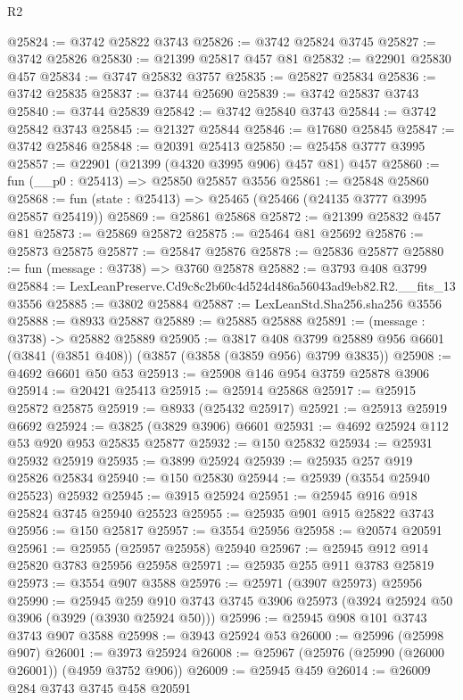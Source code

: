 \begin{lexlean}{R2}
\begin{coremodule}
@25824 := @3742 @25822 @3743
@25826 := @3742 @25824 @3745
@25827 := @3742 @25826
@25830 := @21399 @25817 @457 @81
@25832 := @22901 @25830 @457
@25834 := @3747 @25832 @3757
@25835 := @25827 @25834
@25836 := @3742 @25835
@25837 := @3744 @25690
@25839 := @3742 @25837 @3743
@25840 := @3744 @25839
@25842 := @3742 @25840 @3743
@25844 := @3742 @25842 @3743
@25845 := @21327 @25844
@25846 := @17680 @25845
@25847 := @3742 @25846
@25848 := @20391 @25413
@25850 := @25458 @3777 @3995
@25857 := @22901 (@21399 (@4320 @3995 @906) @457 @81) @457
@25860 := fun (__p0 : @25413) => @25850 @25857 @3556
@25861 := @25848 @25860
@25868 := fun (state : @25413) => @25465 (@25466 (@24135 @3777 @3995 @25857 @25419))
@25869 := @25861 @25868
@25872 := @21399 @25832 @457 @81
@25873 := @25869 @25872
@25875 := @25464 @81 @25692
@25876 := @25873 @25875
@25877 := @25847 @25876
@25878 := @25836 @25877
@25880 := fun (message : @3738) => @3760 @25878
@25882 := @3793 @408 @3799
@25884 := LexLeanPreserve.Cd9c8c2b60c4d524d486a56043ad9eb82.R2.__fits_13 @3556
@25885 := @3802 @25884
@25887 := LexLeanStd.Sha256.sha256 @3556
@25888 := @8933 @25887
@25889 := @25885 @25888
@25891 := (message : @3738) -> @25882 @25889
@25905 := @3817
    @408
    @3799
    @25889
    @956
    @6601
    (@3841 (@3851 @408))
    (@3857 (@3858 (@3859 @956) @3799 @3835))
@25908 := @4692 @6601 @50 @53
@25913 := @25908 @146 @954 @3759 @25878 @3906
@25914 := @20421 @25413
@25915 := @25914 @25868
@25917 := @25915 @25872 @25875
@25919 := @8933 (@25432 @25917)
@25921 := @25913 @25919 @6692
@25924 := @3825 (@3829 @3906) @6601
@25931 := @4692 @25924 @112 @53 @920 @953 @25835 @25877
@25932 := @150 @25832
@25934 := @25931 @25932 @25919
@25935 := @3899 @25924
@25939 := @25935 @257 @919 @25826 @25834
@25940 := @150 @25830
@25944 := @25939 (@3554 @25940 @25523) @25932
@25945 := @3915 @25924
@25951 := @25945 @916 @918 @25824 @3745 @25940 @25523
@25955 := @25935 @901 @915 @25822 @3743
@25956 := @150 @25817
@25957 := @3554 @25956
@25958 := @20574 @20591
@25961 := @25955 (@25957 @25958) @25940
@25967 := @25945 @912 @914 @25820 @3783 @25956 @25958
@25971 := @25935 @255 @911 @3783 @25819
@25973 := @3554 @907 @3588
@25976 := @25971 (@3907 @25973) @25956
@25990 := @25945
    @259
    @910
    @3743
    @3745
    @3906
    @25973
    (@3924 @25924 @50 @3906 (@3929 (@3930 @25924 @50)))
@25996 := @25945 @908 @101 @3743 @3743 @907 @3588
@25998 := @3943 @25924 @53
@26000 := @25996 (@25998 @907)
@26001 := @3973 @25924
@26008 := @25967 (@25976 (@25990 (@26000 @26001)) (@4959 @3752 @906))
@26009 := @25945 @459
@26014 := @26009 @284 @3743 @3745 @458 @20591

\end{coremodule}
\end{lexlean}
